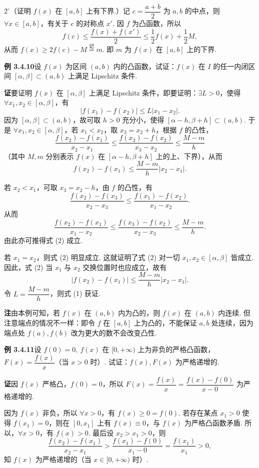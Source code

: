 \documentclass[UTF8,12pt,a4paper,fontset=fandol]{ctexart}
\begin{document}
$2^\circ$（证明 $f(x)$ 在 $[a,b]$ 上有下界.）记 $c=\dfrac{a+b}{2}$ 为 $a,b$ 的中点，则 $\forall x\in[a,b]$，有关于 $c$ 的对称点 $x'$. 因 $f$ 为凸函数，所以
\[
  f(c)\le \frac{f(x)+f(x')}{2}\le \frac12f(x)+\frac12M,
\]
从而 $f(x)\ge2f(c)-M\overset{\text{记}}{=}m$. 即 $m$ 为 $f(x)$ 在 $[a,b]$ 上的下界.

\noindent\textbf{例 3.4.10}\quad 设 $f(x)$ 为区间 $(a,b)$ 内的凸函数，试证：$f(x)$ 在 $I$ 的任一内闭区间 $[\alpha,\beta]\subset(a,b)$ 上满足 Lipschitz 条件.

\noindent\textbf{证}\quad 要证明 $f(x)$ 在 $[\alpha,\beta]$ 上满足 Lipschitz 条件，即要证明：$\exists L>0$，使得 $\forall x_1,x_2\in[\alpha,\beta]$，有
\[
  |f(x_1)-f(x_2)|\le L|x_1-x_2|. \tag{1}
\]
因为 $[\alpha,\beta]\subset(a,b)$，故可取 $h>0$ 充分小，使得 $[\alpha-h,\beta+h]\subset(a,b)$. 于是 $\forall x_1,x_2\in[\alpha,\beta]$，若 $x_1<x_2$，取 $x_3=x_2+h$，根据 $f$ 的凸性，
\[
  \frac{f(x_2)-f(x_1)}{x_2-x_1}
  \le \frac{f(x_3)-f(x_2)}{x_3-x_2}\le \frac{M-m}{h}
\]
（其中 $M,m$ 分别表示 $f(x)$ 在 $[\alpha-h,\beta+h]$ 上的上、下界），从而
\[
  f(x_2)-f(x_1)\le \frac{M-m}{h}|x_2-x_1|. \tag{2}
\]

若 $x_2<x_1$，可取 $x_3=x_2-h$，由 $f$ 的凸性，有
\[
  \frac{f(x_2)-f(x_3)}{x_2-x_3}
  \le \frac{f(x_1)-f(x_2)}{x_1-x_2}.
\]
从而
\[
  \frac{f(x_2)-f(x_1)}{x_1-x_2}
  \le \frac{f(x_3)-f(x_2)}{x_2-x_3}\le \frac{M-m}{h}.
\]
由此亦可推得式 (2) 成立.

若 $x_1=x_2$，则式 (2) 明显成立. 这就证明了式 (2) 对一切 $x_1,x_2\in[\alpha,\beta]$ 皆成立. 因此，式 (2) 当 $x_1$ 与 $x_2$ 交换位置时也应成立，故有
\[
  |f(x_2)-f(x_1)|\le \frac{M-m}{h}|x_2-x_1|.
\]
令 $L=\dfrac{M-m}{h}$，则式 (1) 获证.

\noindent\textbf{注}\quad 由本例可知，若 $f(x)$ 在 $(a,b)$ 内为凸的，则 $f(x)$ 在 $(a,b)$ 内连续. 但注意端点的情况不一样：即令 $f$ 在 $[a,b]$ 上为凸的，不能保证 $a,b$ 处连续，因为端点处 $f(a),f(b)$ 改为更大的数不会改变凸性.

\noindent\textbf{例 3.4.11}\quad 设 $f(0)=0,\ f(x)$ 在 $[0,+\infty)$ 上为非负的严格凸函数，$F(x)=\dfrac{f(x)}x$（当 $x>0$ 时）. 试证：$f(x),F(x)$ 为严格递增的.

\noindent\textbf{证}\quad 因 $f(x)$ 严格凸，$f(0)=0$，所以 $F(x)=\dfrac{f(x)}x=\dfrac{f(x)-f(0)}{x-0}$ 为严格递增的.

因为 $f(x)$ 非负，所以 $\forall x>0$，有 $f(x)\ge0=f(0)$. 若存在某点 $x_1>0$ 使得 $f(x_1)=0$，则在 $[0,x_1]$ 上有 $f(x)\equiv0$，与 $f(x)$ 为严格凸函数矛盾. 所以，$\forall x>0$，有 $f(x)>0$. 最后设 $x_2>x_1>0$，则
\[
  \frac{f(x_2)-f(x_1)}{x_2-x_1}
  >\frac{f(x_1)-f(0)}{x_1-0}=\frac{f(x_1)}{x_1}>0,
\]
知 $f(x)$ 为严格递增的（当 $x\in[0,+\infty)$ 时）.
\end{document}

